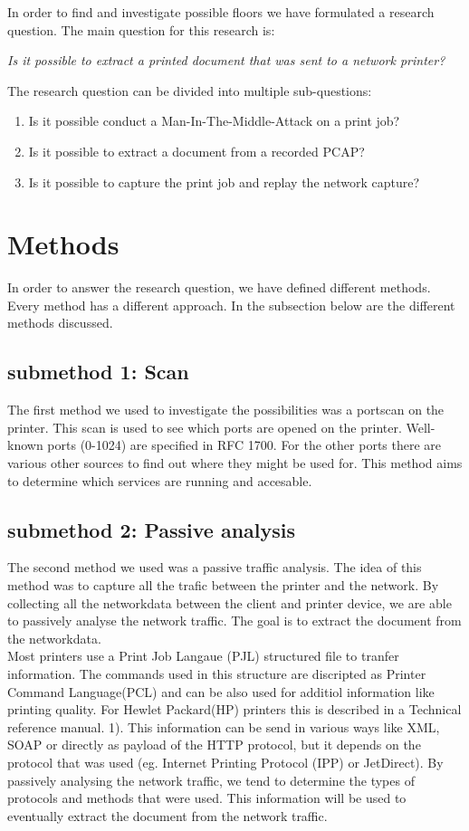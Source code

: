 \documentclass[a4paper]{article}
\begin{document}
In order to find and investigate possible floors we have formulated a research question. The main question for this research is: 
\begin{center}
\textit{Is it possible to extract a printed document that was sent to a network printer?}
\end{center}
The research question can be divided into multiple sub-questions:
\begin{enumerate}
\item Is it possible conduct a Man-In-The-Middle-Attack on a print job?
\item Is it possible to extract a document from a recorded PCAP?
\item Is it possible to capture the print job and replay the network capture?
\end{enumerate}

\section{Methods} 
In order to answer the research question, we have defined different methods. Every method has a different approach. In the subsection below are the different methods discussed.

\subsection{submethod 1: Scan}
The first method we used to investigate the possibilities was a portscan on the printer. This scan is used to see which ports are opened on the printer. Well-known ports (0-1024) are specified in RFC 1700. For the other ports there are various other sources to find out where they might be used for. This method aims to determine which services are running and accesable. 

\subsection{submethod 2: Passive analysis}
The second method we used was a passive traffic analysis. The idea of this method was to capture all the trafic between the printer and the network. By collecting all the networkdata between the client and printer device, we are able to passively analyse the network traffic. The goal is to extract the document from the networkdata. \\

Most printers use a Print Job Langaue (PJL) structured file to tranfer information. The commands used in this structure are discripted as Printer Command Language(PCL) and can be also used for additiol information like printing quality. For Hewlet Packard(HP) printers this is described in a Technical reference manual. 1). This information can be send in various ways like XML, SOAP or directly as payload of the HTTP protocol, but it depends  on the protocol that was used (eg. Internet Printing Protocol (IPP) or JetDirect). By passively analysing the network traffic, we tend to determine the types of protocols and methods that were used. This information will be used to eventually extract the document from the network traffic.
\end{document}
